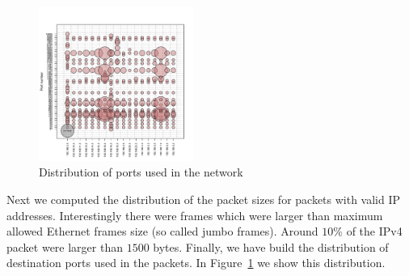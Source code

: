 \begin{figure}[!hbt]
  \includegraphics[width=0.45\textwidth]{graphics/bubble_plot_distribution_of_open_ports.pdf }
  \caption{Distribution of ports used in the network}
  \label{fig:ports}
\end{figure}   

Next we computed the distribution of the packet sizes for packets with valid IP addresses. Interestingly there were frames which were larger than maximum allowed Ethernet frames 
size (so called jumbo frames). Around $10\%$ of the IPv4 packet were larger than $1500$ bytes. Finally, we have build the distribution 
of destination ports used in the packets. In Figure~\ref{fig:ports} we show this distribution.


